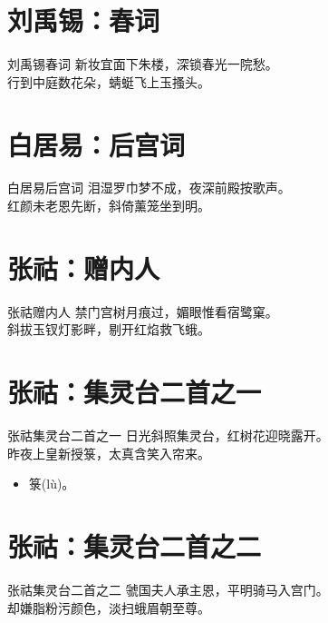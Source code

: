 \documentclass[12pt,oneside,a5paper]{book}
\begin{document}
\chapter{刘禹锡：春词}
\begin{poemzh}{刘禹锡}{春词}
新妆宜面下朱楼，深锁春光一院愁。\\
行到中庭数花朵，蜻蜓飞上玉搔头。\\ 
\end{poemzh}

\chapter{白居易：后宫词}
\begin{poemzh}{白居易}{后宫词}
泪湿罗巾梦不成，夜深前殿按歌声。\\
红颜未老恩先断，斜倚薰笼坐到明。\\ 
\end{poemzh}

\chapter{张祜：赠内人}
\begin{poemzh}{张祜}{赠内人}
禁门宫树月痕过，媚眼惟看宿鹭窠。\\
斜拔玉钗灯影畔，剔开红焰救飞蛾。\\ 
\end{poemzh}

\chapter{张祜：集灵台二首之一}
\begin{poemzh}{张祜}{集灵台二首之一}
日光斜照集灵台，红树花迎晓露开。\\
昨夜上皇新授箓，太真含笑入帘来。\\ 
\end{poemzh}

\begin{itemize}
\item 箓(lù)。
\end{itemize}

\chapter{张祜：集灵台二首之二}
\begin{poemzh}{张祜}{集灵台二首之二}
虢国夫人承主恩，平明骑马入宫门。\\
却嫌脂粉污颜色，淡扫蛾眉朝至尊。\\ 
\end{poemzh}
\end{document}
